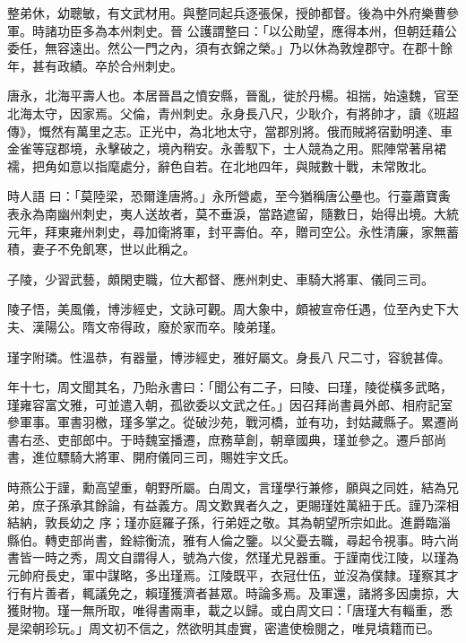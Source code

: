 \begin{pinyinscope}
 整弟休，幼聰敏，有文武材用。與整同起兵逐張保，授帥都督。後為中外府樂曹參軍。時諸功臣多為本州刺史。晉
 公護謂整曰：「以公勛望，應得本州，但朝廷藉公委任，無容遠出。然公一門之內，須有衣錦之榮。」乃以休為敦煌郡守。在郡十餘年，甚有政績。卒於合州刺史。



 唐永，北海平壽人也。本居晉昌之憤安縣，晉亂，徙於丹楊。祖揣，始遠魏，官至北海太守，因家焉。父倫，青州刺史。永身長八尺，少耿介，有將帥才，讀《班超傳》，慨然有萬里之志。正光中，為北地太守，當郡別將。俄而賊將宿勤明達、車金雀等寇郡境，永擊破之，境內稍安。永善馭下，士人競為之用。熙陣常著帛裙襦，把角如意以指麾處分，辭色自若。在北地四年，與賊數十戰，未常敗北。



 時人語
 曰：「莫陸梁，恐爾逢唐將。」永所營處，至今猶稱唐公壘也。行臺蕭寶夤表永為南幽州刺史，夷人送故者，莫不垂淚，當路遮留，隨數日，始得出境。大統元年，拜東雍州刺史，尋加衛將軍，封平壽伯。卒，贈司空公。永性清廉，家無蓄積，妻子不免飢寒，世以此稱之。



 子陵，少習武藝，頗閑吏職，位大都督、應州刺史、車騎大將軍、儀同三司。



 陵子悟，美風儀，博涉經史，文詠可觀。周大象中，頗被宣帝任遇，位至內史下大夫、漢陽公。隋文帝得政，廢於家而卒。陵弟瑾。



 瑾字附璘。性溫恭，有器量，博涉經史，雅好屬文。身長八
 尺二寸，容貌甚偉。



 年十七，周文聞其名，乃貽永書曰：「聞公有二子，曰陵、曰瑾，陵從橫多武略，瑾雍容富文雅，可並遣入朝，孤欲委以文武之任。」因召拜尚書員外郎、相府記室參軍事。軍書羽檄，瑾多掌之。從破沙苑，戰河橋，並有功，封姑藏縣子。累遷尚書右丞、吏部郎中。于時魏室播遷，庶務草創，朝章國典，瑾並參之。遷戶部尚書，進位驃騎大將軍、開府儀同三司，賜姓宇文氏。



 時燕公于謹，勳高望重，朝野所屬。白周文，言瑾學行兼修，願與之同姓，結為兄弟，庶子孫承其餘論，有益義方。周文歎異者久之，更賜瑾姓萬紐于氏。謹乃深相結納，敦長幼之
 序；瑾亦庭羅子孫，行弟姪之敬。其為朝望所宗如此。進爵臨淄縣伯。轉吏部尚書，銓綜衡流，雅有人倫之鑒。以父憂去職，尋起令視事。時六尚書皆一時之秀，周文自謂得人，號為六俊，然瑾尤見器重。于謹南伐江陵，以瑾為元帥府長史，軍中謀略，多出瑾焉。江陵既平，衣冠仕伍，並沒為僕隸。瑾察其才行有片善者，輒議免之，賴瑾獲濟者甚眾。時論多焉。及軍還，諸將多因虜掠，大獲財物。瑾一無所取，唯得書兩車，載之以歸。或白周文曰：「唐瑾大有輜重，悉是梁朝珍玩。」周文初不信之，然欲明其虛實，密遣使檢閱之，唯見墳籍而已。




\end{pinyinscope}

